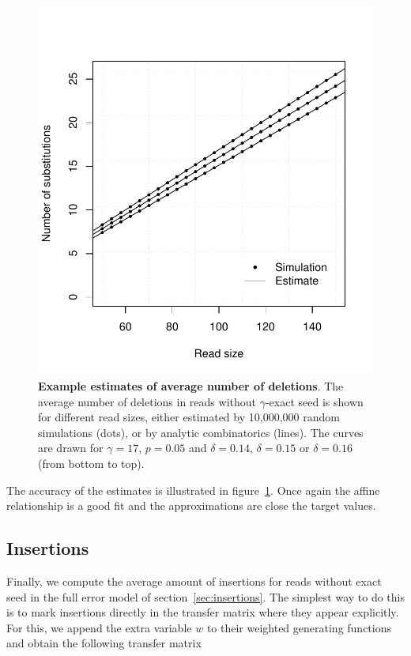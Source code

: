 \documentclass{article}
\begin{document}
\begin{figure}[h]
\centering
\includegraphics[scale=0.445]{simuldel-average2.pdf}
\caption{\textbf{Example estimates of average number of deletions}. The
average number of deletions in reads without $\gamma$-exact seed is
shown for different read sizes, either estimated by 10,000,000 random
simulations (dots), or by analytic combinatorics (lines). The curves are
drawn for $\gamma=17$, $p=0.05$ and $\delta=0.14$, $\delta=0.15$ or
$\delta=0.16$ (from bottom to top).}
\label{fig:simulavdel}
\end{figure}

The accuracy of the estimates is illustrated in
figure~\ref{fig:simulavdel}. Once again the affine relationship is a good
fit and the approximations are close the target values.





\subsection{Insertions}
\label{sec:avins}

Finally, we compute the average amount of insertions for reads without
exact seed in the full error model of section~\ref{sec:insertions}. The
simplest way to do this is to mark insertions directly in the transfer
matrix where they appear explicitly. For this, we append the extra
variable $w$ to their weighted generating functions and obtain the
following transfer matrix
\end{document}
